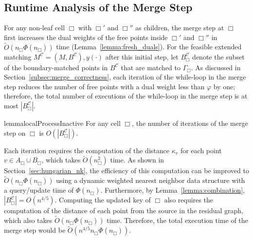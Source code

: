 \documentclass[11pt,onecolumn]{article}
\def\mcC{{\mathcal{C}}}
\newcommand{\cell}{\Box}
\newcommand{\ymax}{\varphi}
\begin{document}
    

%

%

%
%
%
%
%

%






%

%
%

%

%

%
%
%
%

%

%
%
%
%
%
%




%
%
%
%
%
%
%
%
    
%

\subsection{Runtime Analysis of the Merge Step} 
For any non-leaf cell $\cell$ with $\cell'$ and $\cell''$ as children, the merge step at $\cell$ first increases the dual weights of the free points inside $\cell'$ and $\cell''$ in $\tilde{O}(n_\cell\Phi(n_\cell))$ time (Lemma~\ref{lemma:fresh_duals}). For the feasible extended matching $M^\mcC=(M, B^\mcC), y(\cdot)$ after this initial step, let $B^\mcC_\cell$ denote the subset of the boundary-matched points in $B^\mcC$ that are matched to $\Gamma_\cell$. As discussed in Section~\ref{subsec:merge_correctness}, each iteration of the while-loop in the merge step reduces the number of free points with a dual weight less than $\ymax$ by one; therefore, the total number of executions of the while-loop in the merge step is at most $|B^\mcC_\cell|$.

\begin{restatable}{lemma}{localProcessInactive}\label{lemma:local-inactive}
    For any cell $\cell$, the number of iterations of the merge step on $\cell$ is $O(|B^\mcC_\cell|)$.
\end{restatable}

Each iteration requires the computation of the distance $\kappa_v$ for each point $v\in A_\cell\cup B_\cell$, which takes $\tilde{O}(n_\cell^2)$ time. As shown in Section~\ref{sec:hungarian_nk}, the efficiency of this computation can be improved to $\tilde{O}(n_\cell\Phi(n_\cell))$ using a dynamic weighted nearest neighbor data structure with a query/update time of $\Phi(n_\cell)$. Furthermore, by Lemma~\ref{lemma:combination}, $|B_{\cell}^\mcC|=O(n^{4/5})$. Computing the updated key of $\cell$ also requires the computation of the distance of each point from the source in the residual graph, which also takes $\tilde{O}(n_\cell\Phi(n_\cell))$ time. Therefore, the total execution time of the merge step would be $\tilde{O}(n^{4/5}n_\cell\Phi(n_\cell))$.
\end{document}
